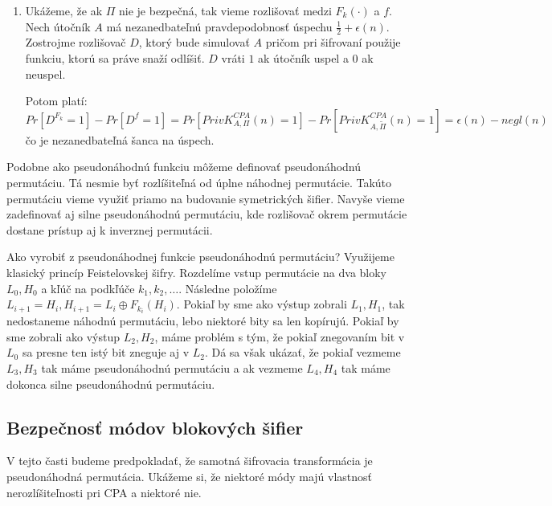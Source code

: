\begin{dokaz}
\begin{enumerate}
    \item Ukážeme, že ak $\Pi$ nie je bezpečná, 
        tak vieme rozlišovať medzi $F_k(\cdot)$ a $f$.
        Nech útočník $A$ má nezanedbateľnú pravdepodobnosť úspechu 
        $\frac{1}{2}+\epsilon(n)$. 
        Zostrojme rozlišovač $D$, ktorý bude simulovať $A$ 
        pričom pri šifrovaní použije funkciu, ktorú sa práve snaží odlíšiť. 
        $D$ vráti $1$ ak útočník uspel a $0$ ak neuspel.

        Potom platí: 
        \begin{equation*}
            Pr[D^{F_k} = 1] - Pr[D^f = 1] = 
                Pr[PrivK_{A,\Pi}^{CPA}(n)=1] - 
                Pr[PrivK_{A,\tilde{\Pi}}^{CPA}(n)=1] 
            = \epsilon(n) - negl(n)
        \end{equation*}
        čo je nezanedbateľná šanca na úspech.
    \end{enumerate}
\end{dokaz}

Podobne ako pseudonáhodnú funkciu môžeme definovať pseudonáhodnú permutáciu. Tá nesmie byť rozlíšiteľná od úplne
náhodnej permutácie. Takúto permutáciu vieme využiť priamo na budovanie symetrických šifier.
Navyše vieme zadefinovať aj silne pseudonáhodnú permutáciu, kde rozlišovač okrem permutácie dostane prístup aj
k inverznej permutácii.

\begin{priklad}
    Ako vyrobiť z pseudonáhodnej funkcie pseudonáhodnú permutáciu?
    Využijeme klasický princíp
    Feistelovskej šifry. Rozdelíme vstup permutácie na dva bloky $L_0, H_0$ 
    a kľúč na podkľúče $k_1, k_2, \dots$. Následne položíme
    $L_{i+1} = H_{i}, H_{i+1} = L_{i} \oplus F_{k_i}(H_i)$.
    Pokiaľ by sme ako výstup zobrali $L_1, H_1$, 
    tak nedostaneme náhodnú permutáciu, lebo niektoré bity sa len kopírujú.
    Pokiaľ by sme zobrali ako výstup $L_2, H_2$, 
    máme problém s tým, že pokiaľ znegovaním bit v $L_0$ sa presne ten
    istý bit zneguje aj v $L_2$.
    Dá sa však ukázať, že pokiaľ vezmeme $L_3, H_3$ tak máme 
    pseudonáhodnú permutáciu a ak vezmeme $L_4, H_4$
    tak máme dokonca silne pseudonáhodnú permutáciu.
\end{priklad}

\subsection{Bezpečnosť módov blokových šifier}

V tejto časti budeme predpokladať, že samotná šifrovacia transformácia je pseudonáhodná permutácia.
Ukážeme si, že niektoré módy majú vlastnosť nerozlíšiteľnosti pri CPA a niektoré nie.

